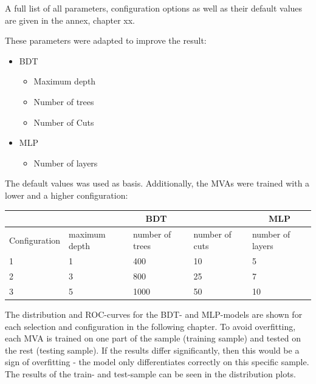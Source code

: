 \documentclass[11pt]{scrartcl}
\begin{document}
	A full list of all parameters, configuration options as well as their default values are given in the annex, chapter xx.
	
	These parameters were adapted to improve the result:
		\begin{itemize}
  			\item BDT
  					\begin{itemize}
  					\item Maximum depth
  					\item Number of trees
  					\item Number of Cuts
  					\end{itemize}
  		  	\item MLP
  					\begin{itemize}
  					\item Number of layers
  					\end{itemize}		
		\end{itemize}
		
	The default values was used as basis. Additionally, the MVAs were trained with a lower and a higher configuration:
	
	\begin{table}[H]
	\begin{tabular}{|l|l|l|l|l|}
	\hline
	              & \multicolumn{3}{c|}{BDT}                         & \multicolumn{1}{c|}{MLP} \\ \hline
	Configuration & maximum depth & number of trees & number of cuts & number of layers         \\ \hline
	1             & 1             & 400             & 10             & 5                        \\ \hline
	2             & 3             & 800             & 25             & 7                        \\ \hline
	3             & 5             & 1000            & 50             & 10                       \\ \hline
	\end{tabular}
	\end{table}

The distribution and ROC-curves for the BDT- and MLP-models are shown for each selection and configuration in the following chapter. To avoid overfitting, each MVA is trained on one part of the sample (training sample) and tested on the rest (testing sample). If the results differ significantly, then this would be a sign of overfitting - the model only differentiates correctly on this specific sample. The results of the train- and test-sample can be seen in the distribution plots.
\end{document}
